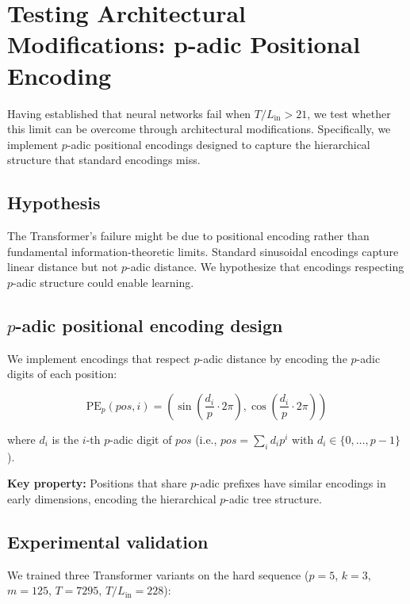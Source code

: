 \documentclass[11pt]{article}
\theoremstyle{plain}
\theoremstyle{definition}
\begin{document}
\section{Testing Architectural Modifications: p-adic Positional Encoding}
\label{sec:padic_encoding}

Having established that neural networks fail when $T/L_{\mathrm{in}} > 21$, we test whether this limit can be overcome through architectural modifications. Specifically, we implement $p$-adic positional encodings designed to capture the hierarchical structure that standard encodings miss.

\subsection{Hypothesis}

The Transformer's failure might be due to positional encoding rather than fundamental information-theoretic limits. Standard sinusoidal encodings capture linear distance but not $p$-adic distance. We hypothesize that encodings respecting $p$-adic structure could enable learning.

\subsection{$p$-adic positional encoding design}

We implement encodings that respect $p$-adic distance by encoding the $p$-adic digits of each position:

\begin{equation}
\mathrm{PE}_p(pos, i) = \left(\sin\left(\frac{d_i}{p} \cdot 2\pi\right), \cos\left(\frac{d_i}{p} \cdot 2\pi\right)\right)
\end{equation}

where $d_i$ is the $i$-th $p$-adic digit of $pos$ (i.e., $pos = \sum_i d_i p^i$ with $d_i \in \{0,\ldots,p-1\}$).

\textbf{Key property:} Positions that share $p$-adic prefixes have similar encodings in early dimensions, encoding the hierarchical $p$-adic tree structure.

\subsection{Experimental validation}

We trained three Transformer variants on the hard sequence ($p=5$, $k=3$, $m=125$, $T=7295$, $T/L_{\mathrm{in}}=228$):
\end{document}
